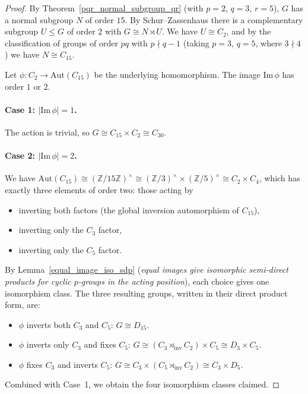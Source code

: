 \begin{proof}
By Theorem~\ref{pqr_normal_subgroup_qr} (with $p=2$, $q=3$, $r=5$), $G$ has a
normal subgroup $N$ of order $15$. By Schur--Zassenhaus there is a complementary
subgroup $U \leq G$ of order $2$ with $G \cong N \rtimes U$.
We have $U \cong C_2$, and by the classification of groups of order $pq$ with
$p \nmid q-1$ (taking $p=3$, $q=5$, where $3 \nmid 4$) we have $N \cong C_{15}$.

Let $\phi : C_2 \to \mathrm{Aut}(C_{15})$ be the underlying homomorphism.
The image $\mathrm{Im}\,\phi$ has order $1$ or $2$.

\paragraph{Case 1: $|\mathrm{Im}\,\phi| = 1$.}
The action is trivial, so $G \cong C_{15} \times C_2 \cong C_{30}$.

\paragraph{Case 2: $|\mathrm{Im}\,\phi| = 2$.}
We have $\mathrm{Aut}(C_{15}) \cong (\mathbb{Z}/15\mathbb{Z})^\times
\cong (\mathbb{Z}/3)^\times \times (\mathbb{Z}/5)^\times \cong C_2 \times C_4$,
which has exactly three elements of order two: those acting by
\begin{itemize}
  \item inverting both factors (the global inversion automorphism of $C_{15}$),
  \item inverting only the $C_3$ factor,
  \item inverting only the $C_5$ factor.
\end{itemize}
By Lemma~\ref{equal_image_iso_sdp} (\textit{equal images give isomorphic
semi-direct products for cyclic $p$-groups in the acting position}), each choice
gives one isomorphism class. The three resulting groups, written in their direct
product form, are:
\begin{itemize}
  \item $\phi$ inverts both $C_3$ and $C_5$: $G \cong D_{15}$.
  \item $\phi$ inverts only $C_3$ and fixes $C_5$:
        $G \cong (C_3 \rtimes_{\mathrm{inv}} C_2) \times C_5 \cong D_3 \times C_5$.
  \item $\phi$ fixes $C_3$ and inverts $C_5$:
        $G \cong C_3 \times (C_5 \rtimes_{\mathrm{inv}} C_2) \cong C_3 \times D_5$.
\end{itemize}
Combined with Case~1, we obtain the four isomorphism classes claimed.
\end{proof}

